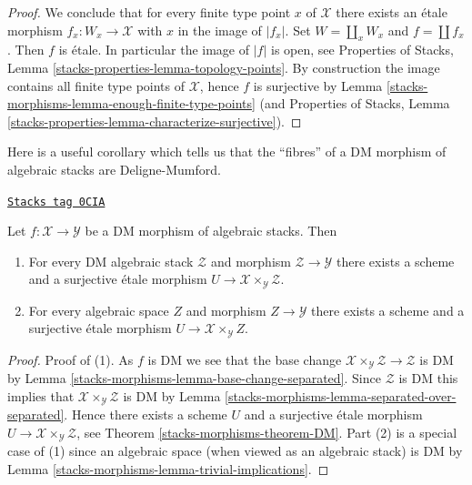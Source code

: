 \begin{proof}
\medskip\noindent
We conclude that for every finite type point $x$ of $\mathcal{X}$ there
exists an \'etale morphism $f_x : W_x \to \mathcal{X}$ with $x$ in the
image of $|f_x|$. Set $W = \coprod_x W_x$ and $f = \coprod f_x$. Then $f$
is \'etale. In particular the image of $|f|$ is open, see
Properties of Stacks, Lemma \ref{stacks-properties-lemma-topology-points}.
By construction the image contains all finite type points of $\mathcal{X}$,
hence $f$ is surjective by
Lemma \ref{stacks-morphisms-lemma-enough-finite-type-points} (and
Properties of Stacks, Lemma
\ref{stacks-properties-lemma-characterize-surjective}).
\end{proof}

Here is a useful corollary which tells us that the ``fibres'' of
a DM morphism of algebraic stacks are Deligne-Mumford.

\begin{lemma}[DM]
\label{stacks-morphisms-lemma-DM}
\href{https://stacks.math.columbia.edu/tag/0CIA}{\texttt{Stacks tag 0CIA}}

Let $f : \mathcal{X} \to \mathcal{Y}$ be a DM morphism of algebraic
stacks. Then
\begin{enumerate}
\item For every DM algebraic stack $\mathcal{Z}$ and morphism
$\mathcal{Z} \to \mathcal{Y}$ there exists a scheme and
a surjective \'etale morphism
$U \to \mathcal{X} \times_\mathcal{Y} \mathcal{Z}$.
\item For every algebraic space $Z$ and morphism
$Z \to \mathcal{Y}$ there exists a scheme and
a surjective \'etale morphism
$U \to \mathcal{X} \times_\mathcal{Y} Z$.
\end{enumerate}
\end{lemma}

\begin{proof}
Proof of (1). As $f$ is DM we see that the base change
$\mathcal{X} \times_\mathcal{Y} \mathcal{Z} \to \mathcal{Z}$ is DM
by Lemma \ref{stacks-morphisms-lemma-base-change-separated}.
Since $\mathcal{Z}$ is DM this implies that
$\mathcal{X} \times_\mathcal{Y} \mathcal{Z}$ is DM
by Lemma \ref{stacks-morphisms-lemma-separated-over-separated}. Hence there exists a
scheme $U$ and a surjective \'etale morphism
$U \to \mathcal{X} \times_\mathcal{Y} \mathcal{Z}$, see
Theorem \ref{stacks-morphisms-theorem-DM}.
Part (2) is a special case of (1) since an algebraic space
(when viewed as an algebraic stack) is DM by
Lemma \ref{stacks-morphisms-lemma-trivial-implications}.
\end{proof}

